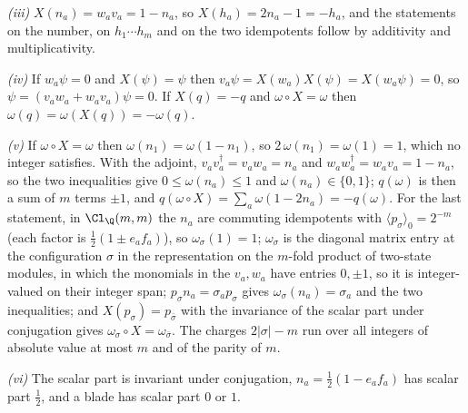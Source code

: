 \emph{(iii)} $X(n_{a}) = w_{a}v_{a} = 1 - n_{a}$, so $X(h_{a}) = 2n_{a} - 1 = -h_{a}$, and the statements on the number, on $h_{1}\cdots h_{m}$ and on the two idempotents follow by additivity and multiplicativity.

\emph{(iv)} If $w_{a}\psi = 0$ and $X(\psi) = \psi$ then $v_{a}\psi = X(w_{a})X(\psi) = X(w_{a}\psi) = 0$, so $\psi = (v_{a}w_{a} + w_{a}v_{a})\psi = 0$. If $X(q) = -q$ and $\omega \circ X = \omega$ then $\omega(q) = \omega(X(q)) = -\omega(q)$.

\emph{(v)} If $\omega \circ X = \omega$ then $\omega(n_{1}) = \omega(1 - n_{1})$, so $2\,\omega(n_{1}) = \omega(1) = 1$, which no integer satisfies. With the adjoint, $v_{a}v_{a}^{\dagger} = v_{a}w_{a} = n_{a}$ and $w_{a}w_{a}^{\dagger} = w_{a}v_{a} = 1 - n_{a}$, so the two inequalities give $0 \le \omega(n_{a}) \le 1$ and $\omega(n_{a}) \in \{0, 1\}$; $q(\omega)$ is then a sum of $m$ terms $\pm 1$, and $q(\omega \circ X) = \sum_{a}\omega(1 - 2n_{a}) = -q(\omega)$. For the last statement, in $\Cl_{\Q}(m,m)$ the $n_{a}$ are commuting idempotents with $\langle p_{\sigma}\rangle_{0} = 2^{-m}$ (each factor is $\tfrac12(1 \pm e_{a}f_{a})$), so $\omega_{\sigma}(1) = 1$; $\omega_{\sigma}$ is the diagonal matrix entry at the configuration $\sigma$ in the representation on the $m$-fold product of two-state modules, in which the monomials in the $v_{a}, w_{a}$ have entries $0, \pm 1$, so it is integer-valued on their integer span; $p_{\sigma}n_{a} = \sigma_{a}p_{\sigma}$ gives $\omega_{\sigma}(n_{a}) = \sigma_{a}$ and the two inequalities; and $X(p_{\sigma}) = p_{\bar\sigma}$ with the invariance of the scalar part under conjugation gives $\omega_{\sigma} \circ X = \omega_{\bar\sigma}$. The charges $2|\sigma| - m$ run over all integers of absolute value at most $m$ and of the parity of $m$.

\emph{(vi)} The scalar part is invariant under conjugation, $n_{a} = \tfrac12(1 - e_{a}f_{a})$ has scalar part $\tfrac12$, and a blade has scalar part $0$ or $1$.
